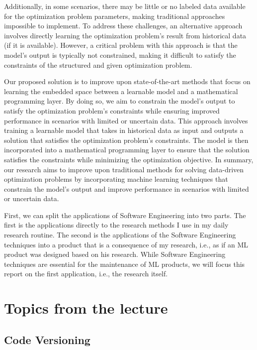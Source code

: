 \documentclass{article}
\begin{document}
Additionally, in some scenarios, there may be little or no labeled data available for the optimization problem parameters, making traditional approaches impossible to implement. To address these challenges, an alternative approach involves directly learning the optimization problem's result from historical data (if it is available). However, a critical problem with this approach is that the model's output is typically not constrained, making it difficult to satisfy the constraints of the structured and given optimization problem. 

Our proposed solution is to improve upon state-of-the-art methods that focus on learning the embedded space between a learnable model and a mathematical programming layer. By doing so, we aim to constrain the model's output to satisfy the optimization problem's constraints while ensuring improved performance in scenarios with limited or uncertain data. This approach involves training a learnable model that takes in historical data as input and outputs a solution that satisfies the optimization problem's constraints. The model is then incorporated into a mathematical programming layer to ensure that the solution satisfies the constraints while minimizing the optimization objective. In summary, our research aims to improve upon traditional methods for solving data-driven optimization problems by incorporating machine learning techniques that constrain the model's output and improve performance in scenarios with limited or uncertain data.

First, we can split the applications of Software Engineering into two parts. The first is the applications directly to the research methods I use in my daily research routine. The second is the applications of the Software Engineering techniques into a product that is a consequence of my research, i.e., as if an ML product was designed based on his research. While Software Engineering techniques are essential for the maintenance of ML products, we will focus this report on the first application, i.e., the research itself.

\section{Topics from the lecture}

\subsection{Code Versioning}
\end{document}
